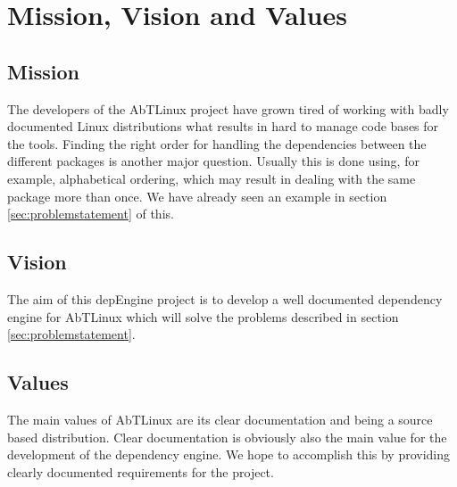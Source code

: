 \section{Mission, Vision and Values}

\subsection{Mission}
The developers of the AbTLinux project have grown tired of working with badly documented Linux distributions what results in hard to manage code bases for the tools. Finding the right order for handling the dependencies between the different packages is another major question. Usually this is done using, for example, alphabetical ordering, which may result in dealing with the same package more than once. We have already seen an example in section \ref{sec:problemstatement} of this.

\subsection{Vision}
The aim of this depEngine project is to develop a well documented dependency engine for AbTLinux which will solve the problems described in section \ref{sec:problemstatement}.

\subsection{Values}
The main values of AbTLinux are its clear documentation and being a source based distribution. Clear documentation is obviously also the main value for the development of the dependency engine. We hope to accomplish this by providing clearly documented requirements for the project.